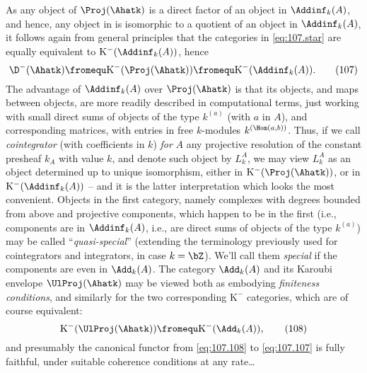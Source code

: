 As any object of $\Proj(\Ahatk)$ is a direct factor of an object in
$\Addinf_k(A)$, and hence, any object in \Ahatk{} is isomorphic to a
quotient of an object in $\Addinf_k(A)$, it follows again from general
principles that the categories in \eqref{eq:107.star} are equally
equivalent to $\mathrm K^-(\Addinf_k(A))$, hence
\begin{equation}
  \label{eq:107.107}
  \D^-(\Ahatk) \fromequ \mathrm K^-(\Proj(\Ahatk)) \fromequ
  \mathrm K^-(\Addinf_k(A)).\tag{107}
\end{equation}
The advantage of $\Addinf_k(A)$ over $\Proj(\Ahatk)$ is that its
objects, and maps between objects, are more readily described in
computational terms, just working with small direct sums of objects of
the type $k^{(a)}$ (with $a$ in $A$), and corresponding matrices, with
entries in free $k$-modules $k^{(\Hom(a,b))}$. Thus, if we call
\emph{cointegrator} (with coefficients in $k$) \emph{for} $A$ any
projective resolution of the constant presheaf $k_A$ with value $k$,
and denote such object by $L_k^A$, we may view $L_k^A$ as an object
determined up to unique isomorphism, either in $\mathrm
K^-(\Proj(\Ahatk))$, or in $\mathrm K^-(\Addinf_k(A))$ -- and it is
the latter interpretation which looks the most convenient. Objects in
the first category, namely complexes with degrees bounded from above
and projective components, which happen to be in the first (i.e.,
components are in $\Addinf_k(A)$, i.e., are direct sums of objects of
the type $k^{(a)}$) may be called ``\emph{quasi-special}'' (extending
the terminology previously used for cointegrators and integrators, in
case $k=\bZ$). We'll call them \emph{special} if the components are
even in $\Add_k(A)$. The category $\Add_k(A)$ and its Karoubi envelope
$\UlProj(\Ahatk)$ may be viewed both as embodying \emph{finiteness
  conditions}, and similarly for the two corresponding $\mathrm K^-$
categories, which are of course equivalent:
\begin{equation}
  \label{eq:107.108}
  \mathrm K^-(\UlProj(\Ahatk)) \fromequ \mathrm K^-(\Add_k(A)),\tag{108}
\end{equation}
and presumably the canonical functor from \eqref{eq:107.108} to
\eqref{eq:107.107} is fully faithful, under suitable coherence
conditions at any rate\ldots

\bigbreak
\noindent\hfill{}\par

